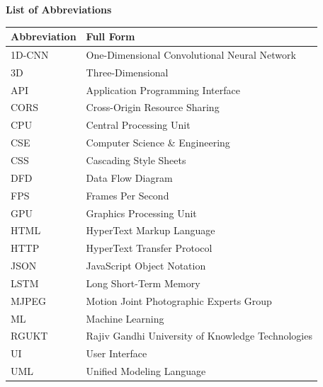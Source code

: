 \documentclass[12pt,a4paper]{report}
\begin{document}
\newpage
\begin{center}
{\Large\bfseries List of Abbreviations} \\[1.0cm]
\end{center}
\begin{longtable}{ll}
\textbf{Abbreviation} & \textbf{Full Form} \\ \midrule
1D-CNN & One-Dimensional Convolutional Neural Network \\
3D & Three-Dimensional \\
API & Application Programming Interface \\
CORS & Cross-Origin Resource Sharing \\
CPU & Central Processing Unit \\
CSE & Computer Science \& Engineering \\
CSS & Cascading Style Sheets \\
DFD & Data Flow Diagram \\
FPS & Frames Per Second \\
GPU & Graphics Processing Unit \\
HTML & HyperText Markup Language \\
HTTP & HyperText Transfer Protocol \\
JSON & JavaScript Object Notation \\
LSTM & Long Short-Term Memory \\
MJPEG & Motion Joint Photographic Experts Group \\
ML & Machine Learning \\
RGUKT & Rajiv Gandhi University of Knowledge Technologies \\
UI & User Interface \\
UML & Unified Modeling Language \\
\end{longtable}

\newpage
{}
\setcounter{page}{1}








\end{document}
